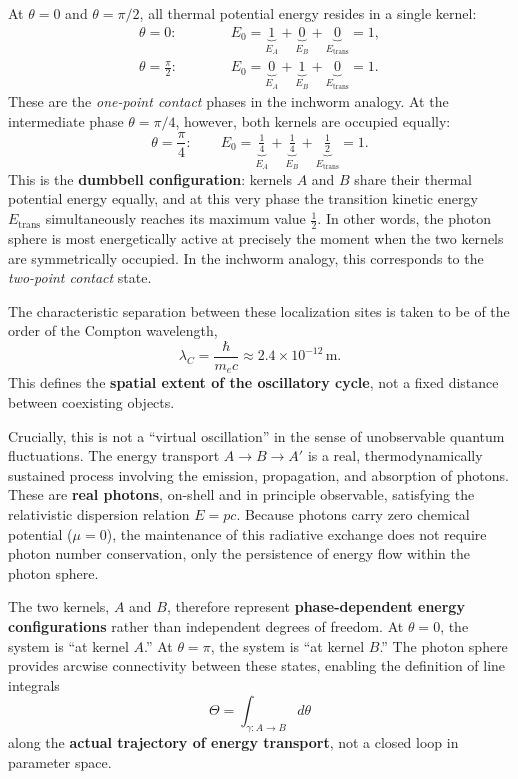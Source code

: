 \documentclass[12pt,letterpaper]{article}
\begin{document}
At $\theta = 0$ and $\theta = \pi/2$, all thermal potential energy resides in a single kernel:
\begin{align}
  \theta = 0:\qquad\quad &E_0 = \underbrace{1}_{E_A} + \underbrace{0}_{E_B} + \underbrace{0}_{E_{\mathrm{trans}}} = 1, \\[6pt]
  \theta = \frac{\pi}{2}:\qquad &E_0 = \underbrace{0}_{E_A} + \underbrace{1}_{E_B} + \underbrace{0}_{E_{\mathrm{trans}}} = 1.
\end{align}
These are the \textit{one-point contact} phases in the inchworm analogy. At the intermediate phase $\theta = \pi/4$, however, both kernels are occupied equally:
\begin{equation}
  \theta = \frac{\pi}{4}:\qquad E_0 = \underbrace{\tfrac{1}{4}}_{E_A} + \underbrace{\tfrac{1}{4}}_{E_B} + \underbrace{\tfrac{1}{2}}_{E_{\mathrm{trans}}} = 1.
\end{equation}
This is the \textbf{dumbbell configuration}: kernels $A$ and $B$ share their thermal potential energy equally, and at this very phase the transition kinetic energy $E_{\mathrm{trans}}$ simultaneously reaches its maximum value $\tfrac{1}{2}$. In other words, the photon sphere is most energetically active at precisely the moment when the two kernels are symmetrically occupied. In the inchworm analogy, this corresponds to the \textit{two-point contact} state.

The characteristic separation between these localization sites is taken to be of the order of the Compton wavelength,
\begin{equation}
\lambda_C = \frac{\hbar}{m_e c} \approx 2.4 \times 10^{-12} \, \mathrm{m}.
\end{equation}
This defines the \textbf{spatial extent of the oscillatory cycle}, not a fixed distance between coexisting objects.

Crucially, this is not a ``virtual oscillation'' in the sense of unobservable quantum fluctuations. The energy transport $A \to B \to A'$ is a real, thermodynamically sustained process involving the emission, propagation, and absorption of photons. These are \textbf{real photons}, on-shell and in principle observable, satisfying the relativistic dispersion relation $E = pc$. Because photons carry zero chemical potential ($\mu = 0$), the maintenance of this radiative exchange does not require photon number conservation, only the persistence of energy flow within the photon sphere.

The two kernels, $A$ and $B$, therefore represent \textbf{phase-dependent energy configurations} rather than independent degrees of freedom. At $\theta = 0$, the system is ``at kernel $A$.'' At $\theta = \pi$, the system is ``at kernel $B$.'' The photon sphere provides arcwise connectivity between these states, enabling the definition of line integrals
\begin{equation}
\Theta = \int_{\gamma: A \to B} d\theta
\end{equation}
along the \textbf{actual trajectory of energy transport}, not a closed loop in parameter space.
\end{document}
